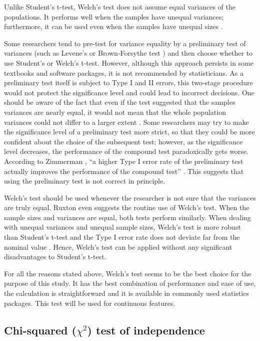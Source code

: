 Unlike Student's t-test, Welch's test does not assume equal variances of the populations. It performs well when the samples have unequal variances; furthermore, it can be used even when the samples have unequal sizes \cite{derrick}.

Some researchers tend to pre-test for variance equality by a preliminary test of variances (such as Levene's \cite{levene} or Brown-Forsythe test \cite{brown}) and then choose whether to use Student's or Welch's t-test. However, although this approach persists in some textbooks and software packages, it is not recommended by statisticians. As a preliminary test itself is subject to Type I and II errors, this two-stage procedure would not protect the significance level and could lead to incorrect decisions. One should be aware of the fact that even if the test suggested that the samples variances are nearly equal, it would not mean that the whole population variances could not differ to a larger extent \cite{zimmerman}. Some researchers may try to make the significance level of a preliminary test more strict, so that they could be more confident about the choice of the subsequent test; however, as the significance level decreases, the performance of the compound test paradoxically gets worse. According to Zimmerman \cite{zimmerman}, ``a higher Type I error rate of the preliminary test actually improves the performance of the compound test'' \cite{zimmerman}. This suggests that using the preliminary test is not correct in principle.

Welch's test should be used whenever the researcher is not sure that the variances are truly equal. Ruxton \cite{ruxton} even suggests the routine use of Welch's test. When the sample sizes and variances are equal, both tests perform similarly. When dealing with unequal variances and unequal sample sizes, Welch's test is more robust than Student's t-test and the Type I error rate does not deviate far from the nominal value \cite{derrick}. Hence, Welch's test can be applied without any significant disadvantages to Student's t-test.

For all the reasons stated above, Welch's test seems to be the best choice for the purpose of this study. It has the best combination of performance and ease of use, the calculation is straightforward and it is available in commonly used statistics packages. This test will be used for continuous features.

\subsection{Chi-squared ($\chi^{2}$) test of independence}

